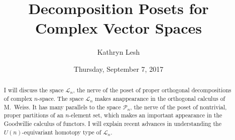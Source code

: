 \documentclass{UAmathtalk}
\author{Kathryn Lesh}
\title{Decomposition Posets for\\ Complex Vector Spaces}
\date{Thursday, September 7, 2017}
\begin{document}
\maketitle

\begin{abstract}
I will discuss the space ${\mathcal{L}}_{n}$, the nerve of the poset of proper orthogonal decompositions of complex $n$-space. The space ${\mathcal{L}}_{n}$ makes an\linebreak appearance in the orthogonal calculus of M.~Weiss. It has many parallels to the space ${\mathcal{P}}_{n}$, the nerve of the poset of nontrivial, proper partitions of an $n$-element set, which makes an important appearance in the Goodwillie calculus of functors. I will explain recent advances in understanding the $U(n)$-equivariant homotopy type of ${\mathcal{L}}_{n}$.
\end{abstract}
\end{document}
